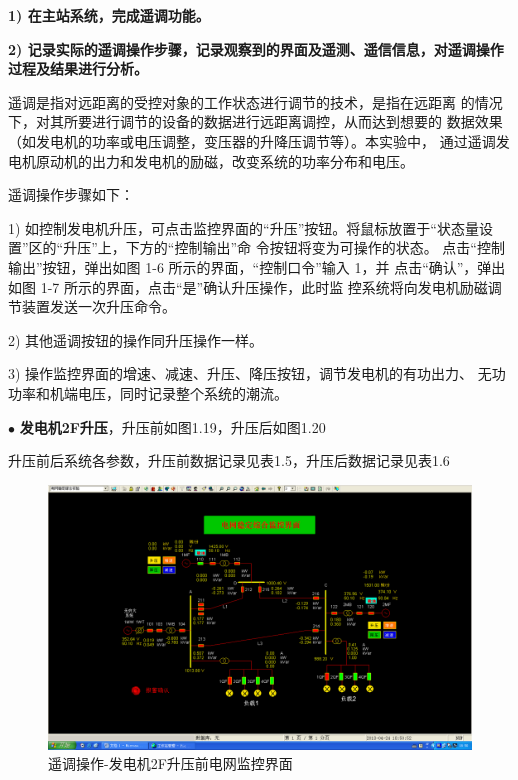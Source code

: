 \documentclass[a4paper]{ctexrep}
\begin{document}
                    \textbf{1) 在主站系统，完成遥调功能。}
                    
                    \textbf{2) 记录实际的遥调操作步骤，记录观察到的界面及遥测、遥信信息，对遥调操作过程及结果进行分析。}

                    遥调是指对远距离的受控对象的工作状态进行调节的技术，是指在远距离 的情况下，对其所要进行调节的设备的数据进行远距离调控，从而达到想要的 数据效果（如发电机的功率或电压调整，变压器的升降压调节等）。本实验中， 通过遥调发电机原动机的出力和发电机的励磁，改变系统的功率分布和电压。

                    遥调操作步骤如下： 
                    
                    1) 如控制发电机升压，可点击监控界面的“升压”按钮。将鼠标放置于“状态量设置”区的“升压”上，下方的“控制输出”命 令按钮将变为可操作的状态。 点击“控制输出”按钮，弹出如图 1-6 所示的界面，“控制口令”输入 1，并 点击“确认”，弹出如图 1-7 所示的界面，点击“是”确认升压操作，此时监 控系统将向发电机励磁调节装置发送一次升压命令。
                    
                    2) 其他遥调按钮的操作同升压操作一样。 
                    
                    3) 操作监控界面的增速、减速、升压、降压按钮，调节发电机的有功出力、 无功功率和机端电压，同时记录整个系统的潮流。


                    $\bullet$ \quad \textbf{发电机2F升压}，升压前如图1.19，升压后如图1.20

                    升压前后系统各参数，升压前数据记录见表1.5，升压后数据记录见表1.6

                    \begin{figure}[htbp]
                        \centering
                        \includegraphics[width=12cm]{20.png}
                        \caption{遥调操作-发电机2F升压前电网监控界面}
                    \end{figure}
\end{document}
